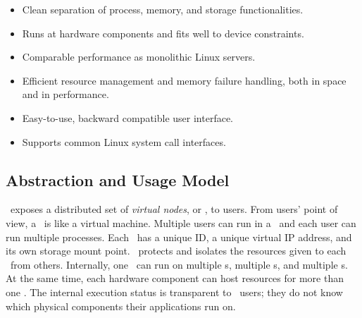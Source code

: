 \documentclass[10pt,times,twocolumn]{z2-article}
\begin{document}
{{{{{{{\begin{itemize}

\vspace{-0.1in}

\item Clean separation of process, memory, and storage functionalities.
\vspace{-0.1in}

\item Runs at hardware components and fits well to device constraints.
\vspace{-0.1in}

\item Comparable performance as monolithic Linux servers.
\vspace{-0.1in}

\item Efficient resource management and memory failure handling, both in space and in performance. %
\vspace{-0.1in}

\item Easy-to-use, backward compatible user interface.
\vspace{-0.1in}

\item Supports common Linux system call interfaces.
\vspace{-0.1in}

\end{itemize}

\subsection{Abstraction and Usage Model}
\lego\ exposes a distributed set of {\em virtual nodes}, or {\em \vnode}, to users.
From users' point of view, a \vnode\ is like a virtual machine. 
Multiple users can run in a \vnode\ and each user can run multiple processes.
Each \vnode\ has a unique ID, a unique virtual IP address, %
and its own storage mount point. %
\lego\ protects and isolates the resources given to each \vnode\ from others.
Internally, one \vnode\ can run on multiple \pcomponent{}s, multiple \mcomponent{}s,
and multiple \scomponent{}s.
At the same time, each hardware component can host resources for more than one \vnode.
The internal execution status is transparent to \lego\ users;
they do not know which physical components their applications run on.

}}}}}}}
\end{document}
